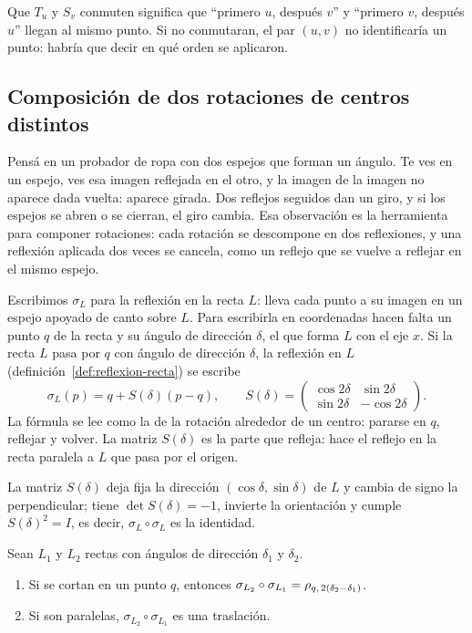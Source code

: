 \begin{atencion}
Que \(T_u\) y \(S_v\) conmuten significa que \enquote{primero \(u\), después \(v\)} y \enquote{primero
\(v\), después \(u\)} llegan al mismo punto. Si no conmutaran, el par \((u,v)\) no
identificaría un punto: habría que decir en qué orden se aplicaron.
\end{atencion}

\subsection{Composición de dos rotaciones de centros distintos}\label{sec:composicion-rotaciones}

Pensá en un probador de ropa con dos espejos que forman un ángulo. Te ves en un espejo, ves
esa imagen reflejada en el otro, y la imagen de la imagen no aparece dada vuelta: aparece
girada. Dos reflejos seguidos dan un giro, y si los espejos se abren o se cierran, el giro
cambia. Esa observación es la herramienta para componer rotaciones: cada rotación se
descompone en dos reflexiones, y una reflexión aplicada dos veces se cancela, como un
reflejo que se vuelve a reflejar en el mismo espejo.

Escribimos \(\sigma_L\) para la reflexión en la recta \(L\): lleva cada punto a su imagen en
un espejo apoyado de canto sobre \(L\). Para escribirla en coordenadas hacen falta un punto
\(q\) de la recta y su ángulo de dirección \(\delta\), el que forma \(L\) con el eje \(x\).
Si la recta \(L\) pasa por \(q\) con ángulo de dirección \(\delta\), la reflexión en \(L\)
(definición~\ref{def:reflexion-recta}) se escribe
\[
\sigma_L(p)=q+S(\delta)(p-q),\qquad
S(\delta)=\begin{pmatrix}\cos2\delta&\sin2\delta\\ \sin2\delta&-\cos2\delta\end{pmatrix}.
\]
La fórmula se lee como la de la rotación alrededor de un centro: pararse en \(q\), reflejar y
volver. La matriz \(S(\delta)\) es la parte que refleja: hace el reflejo en la recta paralela
a \(L\) que pasa por el origen.

La matriz \(S(\delta)\) deja fija la dirección \((\cos\delta,\sin\delta)\) de \(L\) y cambia
de signo la perpendicular; tiene \(\det S(\delta)=-1\), invierte la orientación y cumple
\(S(\delta)^2=I\), es decir, \(\sigma_L\circ\sigma_L\) es la identidad.

\begin{proposicion}\label{prop:dos-reflexiones}
Sean \(L_1\) y \(L_2\) rectas con ángulos de dirección \(\delta_1\) y \(\delta_2\).
\begin{enumerate}
  \item Si se cortan en un punto \(q\), entonces
  \(\sigma_{L_2}\circ\sigma_{L_1}=\rho_{q,\,2(\delta_2-\delta_1)}\).
  \item Si son paralelas, \(\sigma_{L_2}\circ\sigma_{L_1}\) es una traslación.
\end{enumerate}
\end{proposicion}

